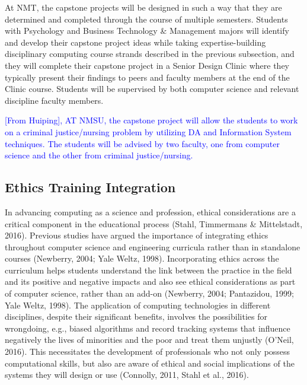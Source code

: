 At NMT, the capstone projects will be designed in such a way that they are determined and completed through the course of multiple semesters. Students with Psychology and Business Technology \& Management majors will identify and develop their capstone project ideas while taking expertise-building disciplinary computing course strands described in the previous subsection, and they will complete their capstone project in a Senior Design Clinic where they typically present their findings to peers and faculty members at the end of the Clinic course. Students will be supervised by both computer science and relevant discipline faculty members.

\textcolor{blue}{[From Huiping], AT NMSU, the capstone project will allow the students to work on a criminal justice/nursing problem by utilizing DA and Information System techniques. The students will be advised by two faculty, one from computer science and the other from criminal justice/nursing.
}

\subsection{Ethics Training Integration}
In advancing computing as a science and profession, ethical considerations are a critical component in the educational process (Stahl, Timmermans \& Mittelstadt, 2016). Previous studies have argued the importance of integrating ethics throughout computer science and engineering curricula rather than in standalone courses (Newberry, 2004; Yale Weltz, 1998). Incorporating ethics across the curriculum helps students understand the link between the practice in the field and its positive and negative impacts and also see ethical considerations as part of computer science, rather than an add-on (Newberry, 2004; Pantazidou, 1999; Yale Weltz, 1998). The application of computing technologies in different disciplines, despite their significant benefits, involves the possibilities for wrongdoing, e.g., biased algorithms and record tracking systems that influence negatively the lives of minorities and the poor and treat them unjustly (O’Neil, 2016). This necessitates the development of professionals who not only possess computational skills, but also are aware of ethical and social implications of the systems they will design or use (Connolly, 2011, Stahl et al., 2016).

